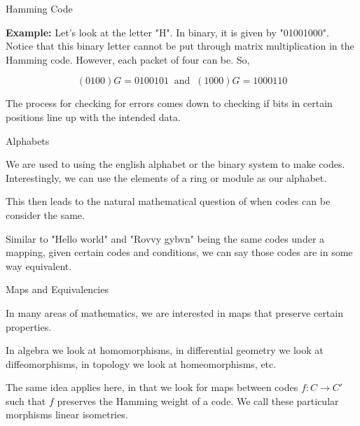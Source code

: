 \documentclass{beamer}
\begin{document}
\begin{frame}{Hamming Code}
    
    \textbf{Example:} Let's look at the letter "H". In binary, it is given by
    "01001000". Notice that this binary letter cannot be put through matrix multiplication in the
    Hamming code. However, each packet of four can be. So,

    $$(0 1 0 0)G=0100101\;\;\text{and}\;\; (1 0 0 0)G=1000110$$

    \bigskip

    \pause

    The process for checking for errors comes down to checking if bits in certain positions line up with
    the intended data.

\end{frame}

\begin{frame}{Alphabets}

    We are used to using the english alphabet or the binary system to make codes. Interestingly, we can
    use the elements of a ring or module as our alphabet.

    \bigskip

    \pause

    This then leads to the natural mathematical question of when codes can be consider the same.

    \medskip

    Similar to "Hello world" and "Rovvy gybvn" being the same codes under a mapping, given certain codes
    and conditions, we can say those codes are in some way equivalent.
    
\end{frame}

\begin{frame}{Maps and Equivalencies}
    
    In many areas of mathematics, we are interested in maps that preserve certain properties.

    \medskip

    In algebra we look at homomorphisms, in differential geometry we look at diffeomorphisms, in
    topology we look at homeomorphisms, etc.

    \bigskip

    \pause

    The same idea applies here, in that we look for maps between codes $f:C\to C'$ such that $f$
    preserves the Hamming weight of a code. We call these particular morphisms linear isometries. 

\end{frame}
\end{document}
